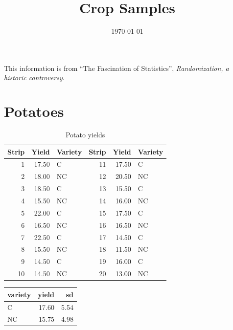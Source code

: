 \documentclass[landscape]{article}
\title{Crop Samples}
\date{\today}
\author{}
\begin{document}
  \maketitle
\begin{note}
  This information is from ``The Fascination of Statistics'', {\em
  Randomization, a historic controversy}.
\end{note}

  \section{Potatoes}

  \begin{table}[H]
    \centering
    \begin{tabular}{rrlrrl}
      \toprule
      Strip & Yield & Variety & Strip & Yield & Variety \\
      \midrule
      1     & 17.50 & C       & 11    & 17.50 & C \\
      2     & 18.00 & NC      & 12    & 20.50 & NC \\
      3     & 18.50 & C       & 13    & 15.50 & C \\
      4     & 15.50 & NC      & 14    & 16.00 & NC \\
      5     & 22.00 & C       & 15    & 17.50 & C \\
      6     & 16.50 & NC      & 16    & 16.50 & NC \\
      7     & 22.50 & C       & 17    & 14.50 & C \\
      8     & 15.50 & NC      & 18    & 11.50 & NC \\
      9     & 14.50 & C       & 19    & 16.00 & C \\
     10     & 14.50 & NC      & 20    & 13.00 & NC \\
      \bottomrule
    \end{tabular}
    \caption{Potato yields}
  \end{table}

  \begin{tabular}{lrr}
    \toprule
    variety & yield & sd \\
    \midrule
    C       & 17.60 & 5.54 \\
    NC      & 15.75 & 4.98 \\
     \bottomrule
  \end{tabular}
\end{document}
